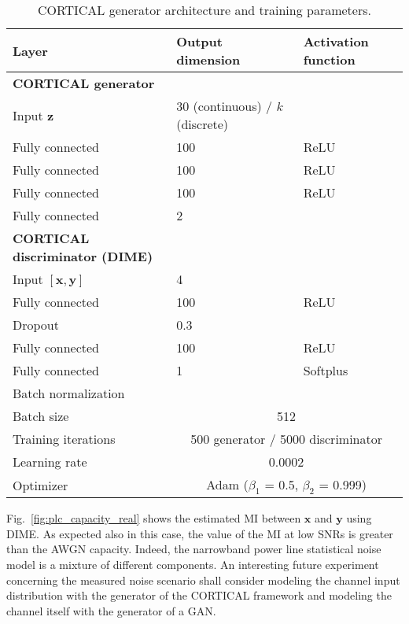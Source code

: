 \begin{table}
	\centering
	\caption{CORTICAL generator architecture and training parameters.}
	\begin{tabular}{ p{4cm}|p{3cm}|p{3cm}} 
		\toprule
		\textbf{Layer} & \textbf{Output dimension } 		& \textbf{Activation function} \\
		\midrule
		\textbf{CORTICAL generator} & &\\
		Input $\mathbf{z}$ & 30 (continuous) / $k$ (discrete) & \\ 
		Fully connected & 100 & ReLU \\ 
		Fully connected &100& ReLU  \\ 
		Fully connected &100& ReLU  \\ 
		Fully connected & 2 &   \\  		\midrule
		
		\textbf{CORTICAL discriminator (DIME)} & &\\
		Input $[\mathbf{x},\mathbf{y}]$ & 4 & \\ 
		Fully connected & 100 & ReLU \\ 
		Dropout  & 0.3 &   \\ 
		Fully connected &100& ReLU  \\ 
		Fully connected & 1 & Softplus  \\ 
		Batch normalization  & & \\  \midrule

		Batch size &  \multicolumn{2}{c}{512}  \\ 
		Training iterations &  \multicolumn{2}{c}{500 generator / 5000 discriminator}  \\ 
		Learning rate &  \multicolumn{2}{c}{0.0002}   \\ 
		Optimizer &  \multicolumn{2}{c}{Adam ($\beta_1$ = 0.5, $\beta_2$ = 0.999)}  \\ 		\midrule

	\end{tabular}
	\label{tab:plc_parameters}
\end{table}

Fig.~\ref{fig:plc_capacity_real} shows the estimated MI between $\mathbf{x}$ and $\mathbf{y}$ using DIME. As expected also in this case, the value of the MI at low SNRs is greater than the AWGN capacity. Indeed, the narrowband power line statistical noise model is a mixture of different components. An interesting future experiment concerning the measured noise scenario shall consider modeling the channel input distribution with the generator of the CORTICAL framework and modeling the channel itself with the generator of a GAN.


